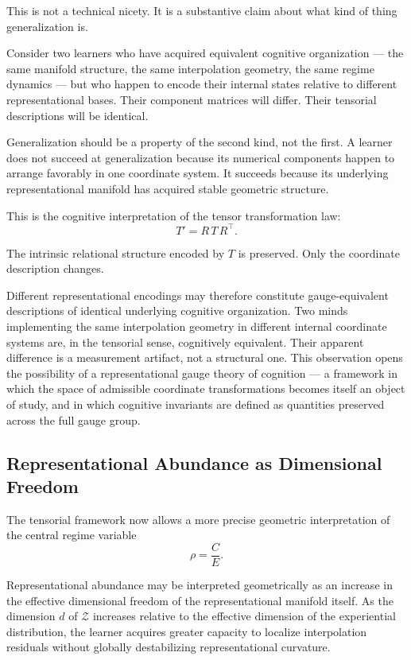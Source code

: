 \documentclass[12pt,a4paper]{article}
\begin{document}
This is not a technical nicety. It is a substantive claim about what kind of thing generalization is.

Consider two learners who have acquired equivalent cognitive organization --- the same manifold structure, the same interpolation geometry, the same regime dynamics --- but who happen to encode their internal states relative to different representational bases. Their component matrices will differ. Their tensorial descriptions will be identical.

Generalization should be a property of the second kind, not the first. A learner does not succeed at generalization because its numerical components happen to arrange favorably in one coordinate system. It succeeds because its underlying representational manifold has acquired stable geometric structure.

This is the cognitive interpretation of the tensor transformation law:
\[
T' = R \, T \, R^\top.
\]

The intrinsic relational structure encoded by $T$ is preserved. Only the coordinate description changes.

Different representational encodings may therefore constitute gauge-equivalent descriptions of identical underlying cognitive organization. Two minds implementing the same interpolation geometry in different internal coordinate systems are, in the tensorial sense, cognitively equivalent. Their apparent difference is a measurement artifact, not a structural one. This observation opens the possibility of a representational gauge theory of cognition --- a framework in which the space of admissible coordinate transformations becomes itself an object of study, and in which cognitive invariants are defined as quantities preserved across the full gauge group.

\subsection{Representational Abundance as Dimensional Freedom}

The tensorial framework now allows a more precise geometric interpretation of the central regime variable
\[
\rho = \frac{C}{E}.
\]

Representational abundance may be interpreted geometrically as an increase in the effective dimensional freedom of the representational manifold itself. As the dimension $d$ of $\mathcal{Z}$ increases relative to the effective dimension of the experiential distribution, the learner acquires greater capacity to localize interpolation residuals without globally destabilizing representational curvature.
\end{document}
